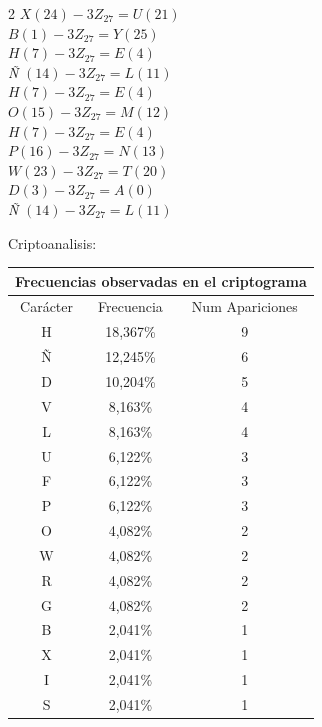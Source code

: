 \documentclass{article}
\begin{document}
\begin{enumerate}
\begin{multicols}{2}
 $X(24)-3 Z_{27}=U (21)$\\
 $B(1)-3 Z_{27}=Y (25)$\\
 $H(7)-3 Z_{27}= E (4)$\\
 \textit{Ñ} $(14)-3 Z_{27}= L (11)$\\
 $H(7)-3 Z_{27}= E (4)$\\
 $O(15)-3 Z_{27}=M (12)$\\
 $H(7)-3 Z_{27}= E (4)$\\
 $P(16)-3 Z_{27}=N (13)$\\ 
 $W(23)-3 Z_{27}=T (20)$\\ 
 $D(3)-3 Z_{27}=A (0)$\\
 \textit{Ñ} $(14)-3 Z_{27}= L (11)$\\
 
 
 
 
 \end{multicols}
      Criptoanalisis:


    

\begin{tabular}{|c|c|c|}
\hline 
\multicolumn{3}{|c|}{Frecuencias observadas en el criptograma} \\ \hline
Carácter & Frecuencia & Num Apariciones \\ \hline 
H & 18,367\% & 9  \\ \hline
Ñ & 12,245\% & 6  \\ \hline
D & 10,204\% & 5  \\ \hline
V & 8,163\% & 4  \\ \hline
L & 8,163\% & 4  \\ \hline
U & 6,122\% & 3  \\ \hline
F & 6,122\% & 3  \\ \hline
P & 6,122\% & 3  \\ \hline
O & 4,082\% & 2  \\ \hline
W & 4,082\% & 2  \\ \hline
R & 4,082\% & 2  \\ \hline
G & 4,082\% & 2  \\ \hline
B & 2,041\% & 1 \\ \hline
X & 2,041\% & 1 \\ \hline
I & 2,041\% & 1 \\ \hline
S & 2,041\% & 1 \\ 
\hline
\end{tabular}
\label{tabla:sencilla}





\end{enumerate}
\end{document}
